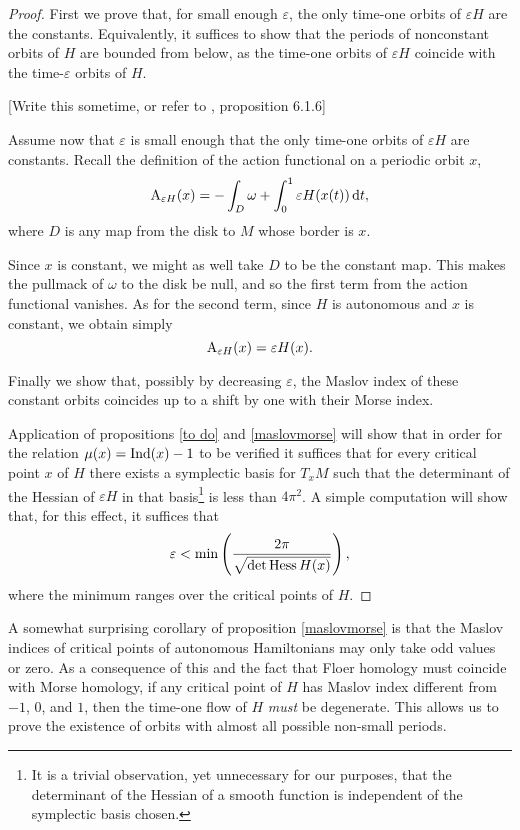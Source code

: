 \begin{proof}
First we prove that, for small enough $\varepsilon$, the only time-one orbits of $\varepsilon H$ are the constants. Equivalently, it suffices to show that the periods of nonconstant orbits of $H$ are bounded from below, as the time-one orbits of $\varepsilon H$ coincide with the time-$\varepsilon$ orbits of $H$.

[Write this sometime, or refer to \cite{audin}, proposition 6.1.6]

Assume now that $\varepsilon$ is small enough that the only time-one orbits of $\varepsilon H$ are constants. Recall the definition of the action functional on a periodic orbit $x$,
\begin{equation}
\AA_{\varepsilon H}(x) = - \int_D \omega + \int_0^1 \varepsilon H(x(t)) \dl t,
\end{equation}
where $D$ is any map from the disk to $M$ whose border is $x$.

Since $x$ is constant, we might as well take $D$ to be the constant map. This makes the pullmack of $\omega$ to the disk be null, and so the first term from the action functional vanishes. As for the second term, since $H$ is autonomous and $x$ is constant, we obtain simply
\begin{equation}
\AA_{\varepsilon H}(x) = \varepsilon H(x).
\end{equation}

Finally we show that, possibly by decreasing $\varepsilon$, the Maslov index of these constant orbits coincides up to a shift by one with their Morse index.

Application of propositions \ref{to do} and \ref{maslovmorse} will show that in order for the relation $\mu(x) = \Ind(x) - 1$ to be verified it suffices that for every critical point $x$ of $H$ there exists a symplectic basis for $T_x M$ such that the determinant of the Hessian of $\varepsilon H$ in that basis\footnote{It is a trivial observation, yet unnecessary for our purposes, that the determinant of the Hessian of a smooth function is independent of the symplectic basis chosen.} is less than $4 \pi^2$. A simple computation will show that, for this effect, it suffices that
\begin{equation}
\varepsilon < \min \left( \frac{2\pi}{\sqrt{\det \hessian H(x)}}\right),
\end{equation}
where the minimum ranges over the critical points of $H$.
\end{proof}

A somewhat surprising corollary of proposition \ref{maslovmorse} is that the Maslov indices of critical points of autonomous Hamiltonians may only take odd values or zero. As a consequence of this and the fact that Floer homology must coincide with Morse homology, if any critical point of $H$ has Maslov index different from $-1$, $0$, and $1$, then the time-one flow of $H$ \emph{must} be degenerate. This allows us to prove the existence of orbits with almost all possible non-small periods.

